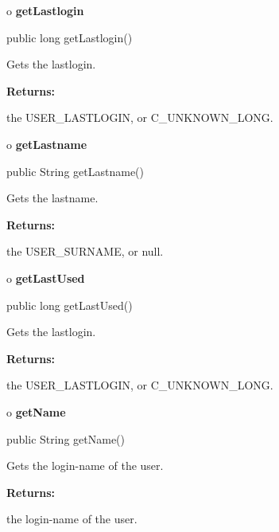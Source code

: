o {\bf getLastlogin} 

\begin{PRE}
 public long getLastlogin()
\end{PRE}

\begin{description}
\htmlDD Gets the lastlogin. 

\begin{description}
\item {\bf Returns:}  

the USER\_LASTLOGIN, or C\_UNKNOWN\_LONG.  
\end{description}

\end{description}

o {\bf getLastname} 

\begin{PRE}
 public String getLastname()
\end{PRE}

\begin{description}
\htmlDD Gets the lastname. 

\begin{description}
\item {\bf Returns:}  

the USER\_SURNAME, or null.  
\end{description}

\end{description}

o {\bf getLastUsed} 

\begin{PRE}
 public long getLastUsed()
\end{PRE}

\begin{description}
\htmlDD Gets the lastlogin. 

\begin{description}
\item {\bf Returns:}  

the USER\_LASTLOGIN, or C\_UNKNOWN\_LONG.  
\end{description}

\end{description}

o {\bf getName} 

\begin{PRE}
 public String getName()
\end{PRE}

\begin{description}
\htmlDD Gets the login-name of the user. 

\begin{description}
\item {\bf Returns:}  

the login-name of the user.  
\end{description}

\end{description}


